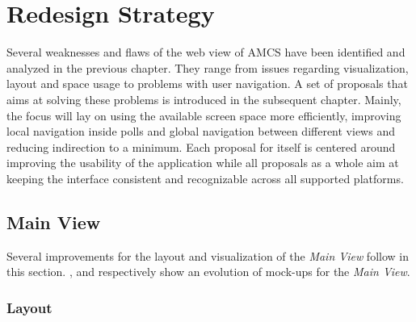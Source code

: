 \chapter{Redesign Strategy}
\label{chapter:redesignstrategy}
Several weaknesses and flaws of the web view of AMCS have been identified and analyzed in the previous chapter. They range from issues regarding visualization, layout and space usage to problems with user navigation.
A set of proposals that aims at solving these problems is introduced in the subsequent chapter. Mainly, the focus will lay on using the available screen space more efficiently, improving local navigation inside polls and global navigation between different views and reducing indirection to a minimum. Each proposal for itself is centered around improving the usability of the application while all proposals as a whole aim at keeping the interface consistent and recognizable across all supported platforms.

\section{Main View}

Several improvements for the layout and visualization of the \emph{Main View} follow in this section. ,  and  respectively show an evolution of mock-ups for the \emph{Main View}.
\subsection{Layout}
\label{section:con:proposals:mainview:layout}
